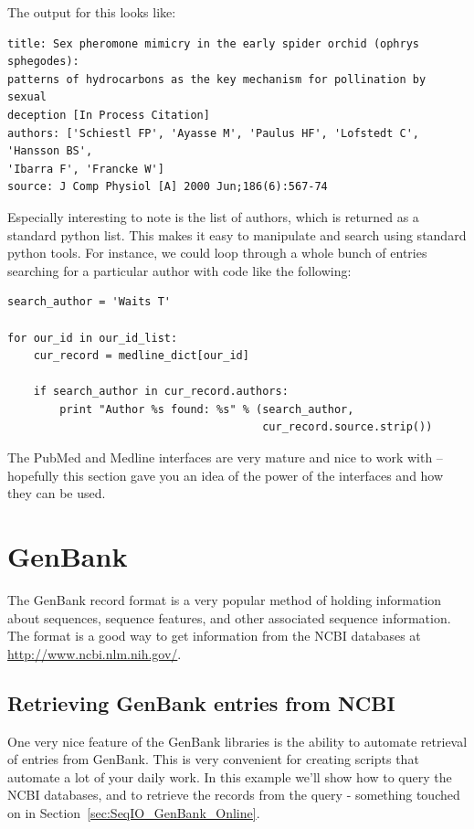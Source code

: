 \documentclass{report}
\begin{document}
The output for this looks like:

\begin{verbatim}
title: Sex pheromone mimicry in the early spider orchid (ophrys sphegodes):
patterns of hydrocarbons as the key mechanism for pollination by sexual
deception [In Process Citation]
authors: ['Schiestl FP', 'Ayasse M', 'Paulus HF', 'Lofstedt C', 'Hansson BS', 
'Ibarra F', 'Francke W']
source: J Comp Physiol [A] 2000 Jun;186(6):567-74
\end{verbatim}

Especially interesting to note is the list of authors, which is returned as a standard python list. This makes it easy to manipulate and search using standard python tools. For instance, we could loop through a whole bunch of entries searching for a particular author with code like the following:

\begin{verbatim}
search_author = 'Waits T'

for our_id in our_id_list:
    cur_record = medline_dict[our_id]
    
    if search_author in cur_record.authors:
        print "Author %s found: %s" % (search_author,
                                       cur_record.source.strip())
\end{verbatim} 

The PubMed and Medline interfaces are very mature and nice to work with -- hopefully this section gave you an idea of the power of the interfaces and how they can be used.

\section{GenBank}

The GenBank record format is a very popular method of holding information about sequences, sequence features, and other associated sequence information. The format is a good way to get information from the NCBI databases at \url{http://www.ncbi.nlm.nih.gov/}. 

\subsection{Retrieving GenBank entries from NCBI}
\label{genbank-retrieval}

One very nice feature of the GenBank libraries is the ability to automate retrieval of entries from GenBank. This is very convenient for creating scripts that automate a lot of your daily work. In this example we'll show how to query the NCBI databases, and to retrieve the records from the query - something touched on in Section~\ref{sec:SeqIO_GenBank_Online}.
\end{document}
